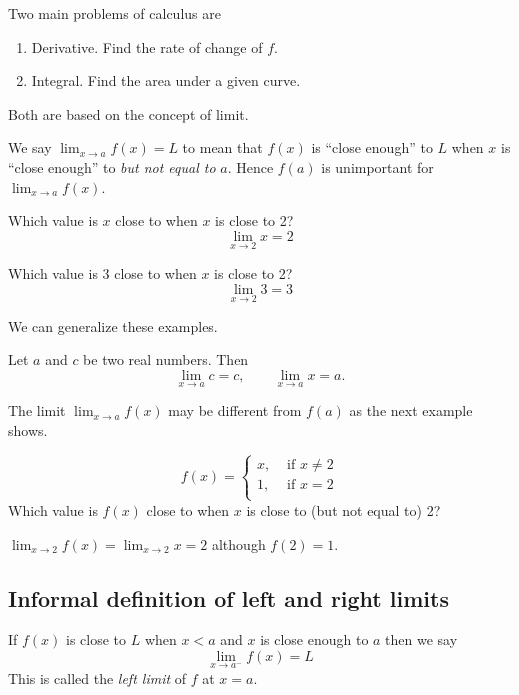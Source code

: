 \documentclass[../calc1-main.tex]{subfiles}
\begin{document}
  Two main problems of calculus are
  \begin{enumerate}
    \item Derivative. Find the rate of change of $f$.
    \item Integral. Find the area under a given curve.
  \end{enumerate}
  Both are based on the concept of limit.

  We say $\lim_{x \to a} f(x) = L$ to mean that $f(x)$ is ``close enough'' to $L$ when $x$ is ``close enough'' to \emph{but not equal to} $a$. Hence $f(a)$ is unimportant for $\lim_{x \to a} f(x)$.

  \begin{example}
    Which value is $x$ close to when $x$ is close to 2?
    \[
      \lim_{x \to 2} x = 2
    \]
  \end{example}

  \begin{example}
    Which value is 3 close to when $x$ is close to 2?
    \[
      \lim_{x \to 2} 3 = 3
    \]
  \end{example}

  We can generalize these examples.
  \begin{theorem}
    \label{basic limit theorems}
    Let $a$ and $c$ be two real numbers. Then
    \[
      \lim_{x \to a} c = c, \qquad
      \lim_{x \to a} x = a.
    \]
  \end{theorem}


  The limit $\lim_{x \to a} f(x)$ may be different from $f(a)$ as the next example shows.
  \begin{example}
    \[
      f(x) =
      \begin{cases}
        x, &\text{ if } x\neq 2\\
        1, &\text{ if } x = 2\\
      \end{cases}
    \]
    Which value is $f(x)$ close to when $x$ is close to (but not equal to) 2?

    $\lim_{x \to 2} f(x) = \lim_{x \to 2} x = 2$ although $f(2) = 1$.
  \end{example}

  \subsection*{Informal definition of left and right limits}
  If $f(x)$ is close to $L$ when $x<a$ and $x$ is close enough to $a$ then we say
  \[
    \lim_{x \to a^{-}} f(x) = L
  \]
  This is called the \emph{left limit} of $f$ at $x=a$.
\end{document}
